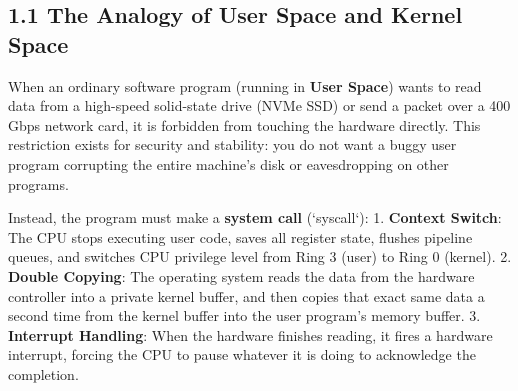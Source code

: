 \documentclass[11pt,twoside,openright]{amsbook}
\begin{document}
{{{{{{{\subsection{1.1 The Analogy of User Space and Kernel Space}
When an ordinary software program (running in \textbf{User Space}) wants to read data from a high-speed solid-state drive (NVMe SSD) or send a packet over a 400 Gbps network card, it is forbidden from touching the hardware directly. This restriction exists for security and stability: you do not want a buggy user program corrupting the entire machine's disk or eavesdropping on other programs.

Instead, the program must make a \textbf{system call} (`syscall`):
1. \textbf{Context Switch}: The CPU stops executing user code, saves all register state, flushes pipeline queues, and switches CPU privilege level from Ring 3 (user) to Ring 0 (kernel).
2. \textbf{Double Copying}: The operating system reads the data from the hardware controller into a private kernel buffer, and then copies that exact same data a second time from the kernel buffer into the user program's memory buffer.
3. \textbf{Interrupt Handling}: When the hardware finishes reading, it fires a hardware interrupt, forcing the CPU to pause whatever it is doing to acknowledge the completion.

}}}}}}}
\end{document}
